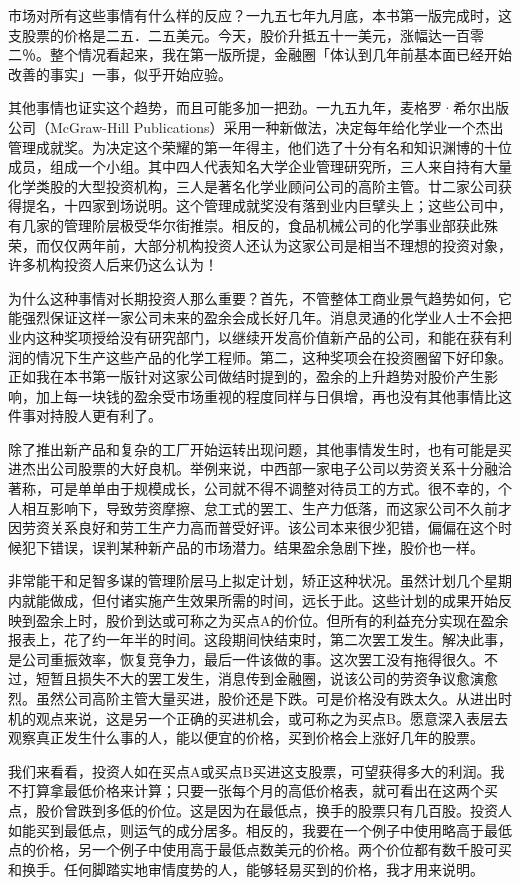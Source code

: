 \documentclass[UTF8,a4paper,zihao=-4,fontset = windows]{ctexart} %
\begin{document}
市场对所有这些事情有什么样的反应？一九五七年九月底，本书第一版完成时，这支股票的价格是二五．二五美元。今天，股价升抵五十一美元，涨幅达一百零二％。整个情况看起来，我在第一版所提，金融圈「体认到几年前基本面已经开始改善的事实」一事，似乎开始应验。

其他事情也证实这个趋势，而且可能多加一把劲。一九五九年，麦格罗·希尔出版公司（McGraw-Hill Publications）采用一种新做法，决定每年给化学业一个杰出管理成就奖。为决定这个荣耀的第一年得主，他们选了十分有名和知识渊博的十位成员，组成一个小组。其中四人代表知名大学企业管理研究所，三人来自持有大量化学类股的大型投资机构，三人是著名化学业顾问公司的高阶主管。廿二家公司获得提名，十四家到场说明。这个管理成就奖没有落到业内巨擘头上；这些公司中，有几家的管理阶层极受华尔街推崇。相反的，食品机械公司的化学事业部获此殊荣，而仅仅两年前，大部分机构投资人还认为这家公司是相当不理想的投资对象，许多机构投资人后来仍这么认为！

为什么这种事情对长期投资人那么重要？首先，不管整体工商业景气趋势如何，它能强烈保证这样一家公司未来的盈余会成长好几年。消息灵通的化学业人士不会把业内这种奖项授给没有研究部门，以继续开发高价值新产品的公司，和能在获有利润的情况下生产这些产品的化学工程师。第二，这种奖项会在投资圈留下好印象。正如我在本书第一版针对这家公司做结时提到的，盈余的上升趋势对股价产生影响，加上每一块钱的盈余受市场重视的程度同样与日俱增，再也没有其他事情比这件事对持股人更有利了。

除了推出新产品和复杂的工厂开始运转出现问题，其他事情发生时，也有可能是买进杰出公司股票的大好良机。举例来说，中西部一家电子公司以劳资关系十分融洽著称，可是单单由于规模成长，公司就不得不调整对待员工的方式。很不幸的，个人相互影响下，导致劳资摩擦、怠工式的罢工、生产力低落，而这家公司不久前才因劳资关系良好和劳工生产力高而普受好评。该公司本来很少犯错，偏偏在这个时候犯下错误，误判某种新产品的市场潜力。结果盈余急剧下挫，股价也一样。

非常能干和足智多谋的管理阶层马上拟定计划，矫正这种状况。虽然计划几个星期内就能做成，但付诸实施产生效果所需的时间，远长于此。这些计划的成果开始反映到盈余上时，股价到达或可称之为买点A的价位。但所有的利益充分实现在盈余报表上，花了约一年半的时间。这段期间快结束时，第二次罢工发生。解决此事，是公司重振效率，恢复竞争力，最后一件该做的事。这次罢工没有拖得很久。不过，短暂且损失不大的罢工发生，消息传到金融圈，说该公司的劳资争议愈演愈烈。虽然公司高阶主管大量买进，股价还是下跌。可是价格没有跌太久。从进出时机的观点来说，这是另一个正确的买进机会，或可称之为买点B。愿意深入表层去观察真正发生什么事的人，能以便宜的价格，买到价格会上涨好几年的股票。

我们来看看，投资人如在买点A或买点B买进这支股票，可望获得多大的利润。我不打算拿最低价格来计算；只要一张每个月的高低价格表，就可看出在这两个买点，股价曾跌到多低的价位。这是因为在最低点，换手的股票只有几百股。投资人如能买到最低点，则运气的成分居多。相反的，我要在一个例子中使用略高于最低点的价格，另一个例子中使用高于最低点数美元的价格。两个价位都有数千股可买和换手。任何脚踏实地审情度势的人，能够轻易买到的价格，我才用来说明。
\end{document}
